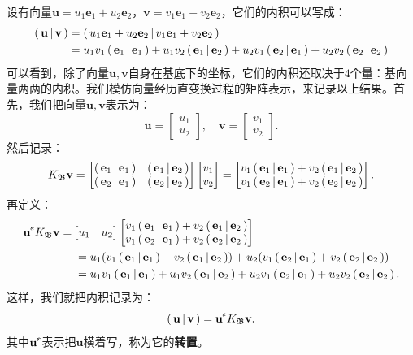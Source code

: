 \documentclass[12pt,UTF8,fontset=none]{ctexbook}
\begin{document}
设有向量$\mathbf{u} = u_1\mathbf{e}_1 + u_2\mathbf{e}_2$，$\mathbf{v} = v_1\mathbf{e}_1 + v_2\mathbf{e}_2$，它们的内积可以写成：
\begin{align*}
    \displaystyle\left( \,\mathbf{u} \,\middle\vert \,\mathbf{v} \,\right) &= \displaystyle\left( \,u_1\mathbf{e}_1 + u_2\mathbf{e}_2 \,\middle\vert \,v_1\mathbf{e}_1 + v_2\mathbf{e}_2 \,\right) \\
    &= u_1v_1 \displaystyle\left( \,\mathbf{e}_1 \,\middle\vert \,\mathbf{e}_1 \,\right) + u_1v_2 \displaystyle\left( \,\mathbf{e}_1 \,\middle\vert \,\mathbf{e}_2 \,\right) + u_2v_1 \displaystyle\left( \,\mathbf{e}_2 \,\middle\vert \,\mathbf{e}_1 \,\right) + u_2v_2 \displaystyle\left( \,\mathbf{e}_2 \,\middle\vert \,\mathbf{e}_2 \,\right) \\
\end{align*}
可以看到，除了向量$\mathbf{u}, \mathbf{v}$自身在基底下的坐标，它们的内积还取决于$4$个量：基向量两两的内积。我们模仿向量经历直变换过程的矩阵表示，来记录以上结果。首先，我们把向量$\mathbf{u}, \mathbf{v}$表示为：
$$ \mathbf{u} = \begin{bmatrix}
    u_1\\ u_2
\end{bmatrix},\quad \mathbf{v} = \begin{bmatrix}
    v_1\\ v_2
\end{bmatrix}. $$
然后记录：
$$ K_{\mathfrak{B}} \mathbf{v} = \begin{bmatrix}
     \displaystyle\left( \,\mathbf{e}_1 \,\middle\vert \,\mathbf{e}_1 \,\right) & \displaystyle\left( \,\mathbf{e}_1 \,\middle\vert \,\mathbf{e}_2 \,\right) \\ \displaystyle\left( \,\mathbf{e}_2 \,\middle\vert \,\mathbf{e}_1 \,\right) & \displaystyle\left( \,\mathbf{e}_2 \,\middle\vert \,\mathbf{e}_2 \,\right)
\end{bmatrix}\begin{bmatrix}
    v_1\\ v_2
\end{bmatrix} = \begin{bmatrix}
    v_1\displaystyle\left( \,\mathbf{e}_1 \,\middle\vert \,\mathbf{e}_1 \,\right) + v_2\displaystyle\left( \,\mathbf{e}_1 \,\middle\vert \,\mathbf{e}_2 \,\right)\\ v_1\displaystyle\left( \,\mathbf{e}_2 \,\middle\vert \,\mathbf{e}_1 \,\right) + v_2\displaystyle\left( \,\mathbf{e}_2 \,\middle\vert \,\mathbf{e}_2 \,\right)
\end{bmatrix}.$$
再定义：
\begin{align*}
    \mathbf{u}^{\tr} K_{\mathfrak{B}} \mathbf{v} =& \begin{bmatrix}
        u_1 & u_2
    \end{bmatrix}\begin{bmatrix}
        v_1\nji{\mathbf{e}_1}{\mathbf{e}_1} + v_2\nji{\mathbf{e}_1}{\mathbf{e}_2}\\ v_1\nji{\mathbf{e}_2}{\mathbf{e}_1} + v_2\nji{\mathbf{e}_2}{\mathbf{e}_2}
    \end{bmatrix} \\
    &\;= u_1 (v_1\nji{\mathbf{e}_1}{\mathbf{e}_1} + v_2\nji{\mathbf{e}_1}{\mathbf{e}_2}) + u_2 (v_1\nji{\mathbf{e}_2}{\mathbf{e}_1} + v_2\nji{\mathbf{e}_2}{\mathbf{e}_2}) \\
    &\;= u_1v_1 \nji{\mathbf{e}_1}{\mathbf{e}_1} + u_1v_2\nji{\mathbf{e}_1}{\mathbf{e}_2} + u_2v_1\nji{\mathbf{e}_2}{\mathbf{e}_1} + u_2v_2\nji{\mathbf{e}_2}{\mathbf{e}_2}.
\end{align*}
这样，我们就把内积记录为：
$$ \nji{\mathbf{u}}{\mathbf{v}} = \mathbf{u}^{\tr} K_{\mathfrak{B}} \mathbf{v}. $$
其中$\mathbf{u}^{\tr}$表示把$\mathbf{u}$横着写，称为它的\textbf{转置}。
\end{document}
